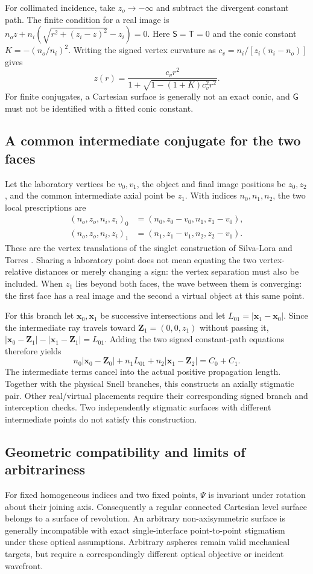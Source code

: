 For collimated incidence, take $z_o\to-\infty$ and subtract the divergent constant
path. The finite condition for a real image is
$n_oz+n_i(\sqrt{r^2+(z_i-z)^2}-z_i)=0$. Here $\mathsf S=\mathsf T=0$ and the
conic constant $K=-(n_o/n_i)^2$. Writing the signed vertex curvature as
$c_v=n_i/[z_i(n_i-n_o)]$ gives
\begin{equation}
 z(r)=\frac{c_v r^2}{1+\sqrt{1-(1+K)c_v^2r^2}}.
 \label{eq:collimated-conic}
\end{equation}
For finite conjugates, a Cartesian surface is generally not an exact conic, and
$\mathsf G$ must not be identified with a fitted conic constant.

\subsection{A common intermediate conjugate for the two faces}
Let the laboratory vertices be $v_0,v_1$, the object and final image positions
be $z_0,z_2$, and the common intermediate axial point be $z_1$. With indices
$n_0,n_1,n_2$, the two local prescriptions are
\begin{align}
 (n_o,z_o,n_i,z_i)_0&=(n_0,z_0-v_0,n_1,z_1-v_0),\\
 (n_o,z_o,n_i,z_i)_1&=(n_1,z_1-v_1,n_2,z_2-v_1).
\end{align}
These are the vertex translations of the singlet construction of
Silva-Lora and Torres \cite[Sec.~3]{silva2020}. Sharing a laboratory point
does not mean equating the two vertex-relative distances or merely changing
a sign: the vertex separation must also be included. When $z_1$ lies beyond
both faces, the wave between them is converging: the first face has a real
image and the second a virtual object at this same point.

For this branch let $\bm x_0,\bm x_1$ be successive intersections and let
$L_{01}=|\bm x_1-\bm x_0|$. Since the intermediate ray travels toward
$\bm Z_1=(0,0,z_1)$ without passing it,
$|\bm x_0-\bm Z_1|-|\bm x_1-\bm Z_1|=L_{01}$.
Adding the two signed constant-path equations therefore yields
\[
 n_0|\bm x_0-\bm Z_0|+n_1L_{01}+n_2|\bm x_1-\bm Z_2|=C_0+C_1.
\]
The intermediate terms cancel into the actual positive propagation length.
Together with the physical Snell branches, this constructs an axially
stigmatic pair. Other real/virtual placements require their corresponding
signed branch and interception checks. Two independently stigmatic surfaces
with different intermediate points do not satisfy this construction.

\subsection{Geometric compatibility and limits of arbitrariness}
For fixed homogeneous indices and two fixed points, $\Psi$ is invariant under
rotation about their joining axis. Consequently a regular connected Cartesian
level surface belongs to a surface of revolution. An arbitrary non-axisymmetric
surface is generally incompatible with exact single-interface point-to-point
stigmatism under these optical assumptions. Arbitrary aspheres remain valid
mechanical targets, but require a correspondingly different optical objective
or incident wavefront.

